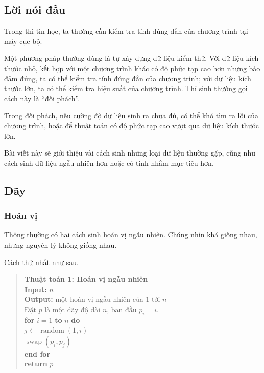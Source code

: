 \documentclass[11pt]{article}
\begin{document}
\subsection{Lời nói đầu}

Trong thi tin học, ta thường cần kiểm tra tính đúng đắn của chương trình tại
máy cục bộ.

Một phương pháp thường dùng là tự xây dựng dữ liệu kiểm thử. Với dữ liệu kích
thước nhỏ, kết hợp với một chương trình khác có độ phức tạp cao hơn nhưng bảo
đảm đúng, ta có thể kiểm tra tính đúng đắn của chương trình; với dữ liệu kích
thước lớn, ta có thể kiểm tra hiệu suất của chương trình. Thí sinh thường gọi
cách này là ``đối phách''.

Trong đối phách, nếu cường độ dữ liệu sinh ra chưa đủ, có thể khó tìm ra lỗi
của chương trình, hoặc để thuật toán có độ phức tạp cao vượt qua dữ liệu kích
thước lớn.

Bài viết này sẽ giới thiệu vài cách sinh những loại dữ liệu thường gặp, cũng
như cách sinh dữ liệu ngẫu nhiên hơn hoặc có tính nhắm mục tiêu hơn.

\subsection{Dãy}

\subsubsection{Hoán vị}

Thông thường có hai cách sinh hoán vị ngẫu nhiên. Chúng nhìn khá giống nhau,
nhưng nguyên lý không giống nhau.

Cách thứ nhất như sau.

\begin{quote}
\textbf{Thuật toán 1: Hoán vị ngẫu nhiên}\\
\textbf{Input:} $n$\\
\textbf{Output:} một hoán vị ngẫu nhiên của $1$ tới $n$\\
Đặt $p$ là một dãy độ dài $n$, ban đầu $p_i=i$.\\
\textbf{for} $i=1$ \textbf{to} $n$ \textbf{do}\\
\hspace*{1.5em}$j\leftarrow \operatorname{random}(1,i)$\\
\hspace*{1.5em}$\operatorname{swap}(p_i,p_j)$\\
\textbf{end for}\\
\textbf{return} $p$
\end{quote}
\end{document}
